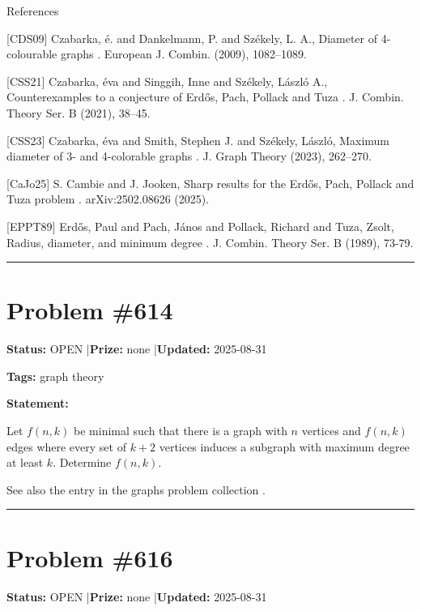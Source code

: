 \documentclass{article}
\begin{document}
References

[CDS09] Czabarka, \'{e}. and Dankelmann, P. and Sz\'{e}kely, L. A., Diameter of 4-colourable graphs . European J. Combin. (2009), 1082--1089.

[CSS21] Czabarka, \'{e}va and Singgih, Inne and Sz\'{e}kely, L\'{a}szl\'{o}{} A., Counterexamples to a conjecture of {E}rd\H{o}s, {P}ach, {P}ollack and Tuza . J. Combin. Theory Ser. B (2021), 38--45.

[CSS23] Czabarka, \'{e}va and Smith, Stephen J. and Sz\'{e}kely, L\'{a}szl\'{o}, Maximum diameter of 3- and 4-colorable graphs . J. Graph Theory (2023), 262--270.

[CaJo25] S. Cambie and J. Jooken, Sharp results for the Erd\H{o}s, Pach, Pollack and Tuza problem . arXiv:2502.08626 (2025).

[EPPT89] Erd\H{o}s, Paul and Pach, J\'{a}nos and Pollack, Richard and Tuza, Zsolt, Radius, diameter, and minimum degree . J. Combin. Theory Ser. B (1989), 73-79.

\noindent\rule{\linewidth}{0.4pt}


\section{Problem \#614}
\label{prob:614}

\noindent\textbf{Status:} OPEN \quad|\quad \textbf{Prize:} none \quad|\quad \textbf{Updated:} 2025-08-31

\noindent\textbf{Tags:} graph theory

\medskip

\noindent\textbf{Statement:}

Let $f(n,k)$ be minimal such that there is a graph with $n$ vertices and $f(n,k)$ edges where every set of $k+2$ vertices induces a subgraph with maximum degree at least $k$. Determine $f(n,k)$.




See also the entry in the graphs problem collection .

\noindent\rule{\linewidth}{0.4pt}


\section{Problem \#616}
\label{prob:616}

\noindent\textbf{Status:} OPEN \quad|\quad \textbf{Prize:} none \quad|\quad \textbf{Updated:} 2025-08-31
\end{document}
